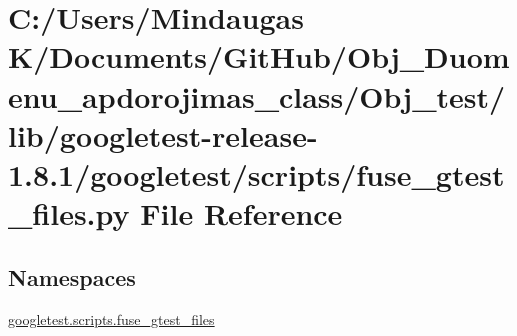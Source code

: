 \hypertarget{_obj__test_2lib_2googletest-release-1_88_81_2googletest_2scripts_2fuse__gtest__files_8py}{}\section{C\+:/\+Users/\+Mindaugas K/\+Documents/\+Git\+Hub/\+Obj\+\_\+\+Duomenu\+\_\+apdorojimas\+\_\+class/\+Obj\+\_\+test/lib/googletest-\/release-\/1.8.1/googletest/scripts/fuse\+\_\+gtest\+\_\+files.py File Reference}
\label{_obj__test_2lib_2googletest-release-1_88_81_2googletest_2scripts_2fuse__gtest__files_8py}
\subsection*{Namespaces}
\begin{DoxyCompactItemize}
\item 
 \mbox{\hyperlink{namespacegoogletest_1_1scripts_1_1fuse__gtest__files}{googletest.\+scripts.\+fuse\+\_\+gtest\+\_\+files}}
\end{DoxyCompactItemize}
